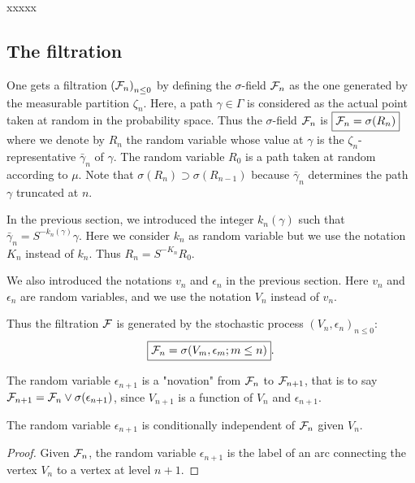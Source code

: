 \documentclass[12pt,a4paper]{article}
\begin{document}
%

xxxxx

\subsection{The filtration}

One gets a filtration ${(\mathcal{F}_n)}_{n \leq 0}$ by defining the $\sigma$-field 
$\mathcal{F}_n$ as the one generated by the measurable partition $\zeta_n$. 
Here, a path $\gamma \in \Gamma$ is considered as the actual point taken at random 
in the probability space. 
Thus the $\sigma$-field $\mathcal{F}_n$ is 
$\boxed{\mathcal{F}_n = \sigma(R_n)}$ where we denote by $R_n$ the random variable whose 
value at $\gamma$ is the $\zeta_n$-representative 
$\bar\gamma_n$ of $\gamma$. 
The random variable  $R_0$ is a path taken at random according to $\mu$. 
Note that $\sigma(R_{n}) \supset \sigma(R_{n-1})$ because 
$\bar\gamma_n$ determines the path 
$\gamma$ truncated at $n$. 

In the previous section, we introduced the integer $k_n(\gamma)$ such that 
$\bar\gamma_n = S^{-k_n(\gamma)}\gamma$. 
Here we consider $k_n$ as random variable but 
we use the notation $K_n$ instead of $k_n$. 
Thus $\boxed{R_n = S^{-K_n} R_0}$. 


We also introduced the notations $v_n$ and $\epsilon_n$ in the previous section. 
Here $v_n$ and $\epsilon_n$ are random variables, 
and we use the notation $V_n$ instead of $v_n$. 

Thus the filtration $\mathcal{F}$ is  generated by the stochastic process 
${(V_n, \epsilon_n)}_{n \leq 0}$:
$$
\boxed{\mathcal{F}_n = \sigma(V_m, \epsilon_m; m \leq n)}.
$$

The random variable $\epsilon_{n+1}$ is a "novation" from $\mathcal{F}_n$ to $\mathcal{F}_{n+1}$, that is 
to say $\mathcal{F}_{n+1} = \mathcal{F}_n \vee \sigma(\epsilon_{n+1})$, since 
$V_{n+1}$ is a function of $V_n$ and $\epsilon_{n+1}$. 


\begin{lemma}
The random variable $\epsilon_{n+1}$ is conditionally independent of $\mathcal{F}_n$ 
given $V_n$. 
\end{lemma} 

\begin{proof}
Given $\mathcal{F}_n$, the random variable $\epsilon_{n+1}$ is the label of an 
arc connecting the vertex $V_n$ to a vertex at level $n+1$. 
\end{proof}
\end{document}
